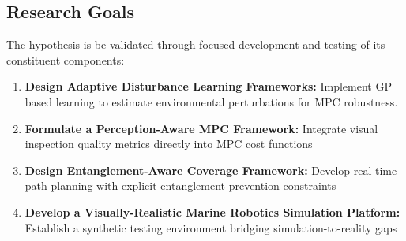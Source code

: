 \subsection{Research Goals}
The hypothesis is  be validated through focused development and testing of its constituent components:



\begin{enumerate}
\item \textbf{Design Adaptive Disturbance Learning Frameworks:}  
Implement \ac{GP} based learning to estimate environmental perturbations for MPC robustness. 

\item \textbf{Formulate a Perception-Aware \ac{MPC} Framework:}  
Integrate visual inspection quality metrics directly into MPC cost functions

\item \textbf{Design Entanglement-Aware Coverage Framework:}  
Develop real-time path planning with explicit entanglement prevention constraints

\item \textbf{Develop a Visually-Realistic Marine Robotics Simulation Platform:}  
Establish a synthetic testing environment bridging simulation-to-reality gaps
\end{enumerate}



